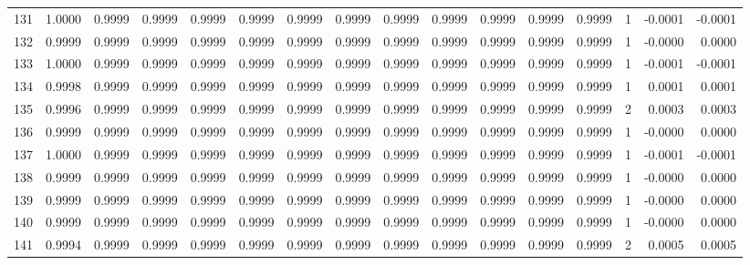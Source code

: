 \begin{tabular}{lrrrrrrrrrrrrrrr}
131 &      1.0000 &  0.9999 &  0.9999 &  0.9999 &  0.9999 &  0.9999 &  0.9999 &  0.9999 &  0.9999 &  0.9999 &   0.9999 &     0.9999 &      1 &                   -0.0001 &                    -0.0001 \\
132 &      0.9999 &  0.9999 &  0.9999 &  0.9999 &  0.9999 &  0.9999 &  0.9999 &  0.9999 &  0.9999 &  0.9999 &   0.9999 &     0.9999 &      1 &                   -0.0000 &                     0.0000 \\
133 &      1.0000 &  0.9999 &  0.9999 &  0.9999 &  0.9999 &  0.9999 &  0.9999 &  0.9999 &  0.9999 &  0.9999 &   0.9999 &     0.9999 &      1 &                   -0.0001 &                    -0.0001 \\
134 &      0.9998 &  0.9999 &  0.9999 &  0.9999 &  0.9999 &  0.9999 &  0.9999 &  0.9999 &  0.9999 &  0.9999 &   0.9999 &     0.9999 &      1 &                    0.0001 &                     0.0001 \\
135 &      0.9996 &  0.9999 &  0.9999 &  0.9999 &  0.9999 &  0.9999 &  0.9999 &  0.9999 &  0.9999 &  0.9999 &   0.9999 &     0.9999 &      2 &                    0.0003 &                     0.0003 \\
136 &      0.9999 &  0.9999 &  0.9999 &  0.9999 &  0.9999 &  0.9999 &  0.9999 &  0.9999 &  0.9999 &  0.9999 &   0.9999 &     0.9999 &      1 &                   -0.0000 &                     0.0000 \\
137 &      1.0000 &  0.9999 &  0.9999 &  0.9999 &  0.9999 &  0.9999 &  0.9999 &  0.9999 &  0.9999 &  0.9999 &   0.9999 &     0.9999 &      1 &                   -0.0001 &                    -0.0001 \\
138 &      0.9999 &  0.9999 &  0.9999 &  0.9999 &  0.9999 &  0.9999 &  0.9999 &  0.9999 &  0.9999 &  0.9999 &   0.9999 &     0.9999 &      1 &                   -0.0000 &                     0.0000 \\
139 &      0.9999 &  0.9999 &  0.9999 &  0.9999 &  0.9999 &  0.9999 &  0.9999 &  0.9999 &  0.9999 &  0.9999 &   0.9999 &     0.9999 &      1 &                   -0.0000 &                     0.0000 \\
140 &      0.9999 &  0.9999 &  0.9999 &  0.9999 &  0.9999 &  0.9999 &  0.9999 &  0.9999 &  0.9999 &  0.9999 &   0.9999 &     0.9999 &      1 &                   -0.0000 &                     0.0000 \\
141 &      0.9994 &  0.9999 &  0.9999 &  0.9999 &  0.9999 &  0.9999 &  0.9999 &  0.9999 &  0.9999 &  0.9999 &   0.9999 &     0.9999 &      2 &                    0.0005 &                     0.0005 \\

\end{tabular}
